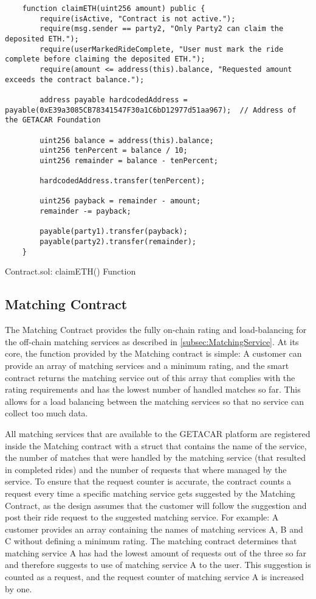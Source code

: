 \begin{Listing}
\begin{lstlisting}
    function claimETH(uint256 amount) public {
        require(isActive, "Contract is not active.");
        require(msg.sender == party2, "Only Party2 can claim the deposited ETH.");
        require(userMarkedRideComplete, "User must mark the ride complete before claiming the deposited ETH.");
        require(amount <= address(this).balance, "Requested amount exceeds the contract balance.");
        
        address payable hardcodedAddress = payable(0xE39a3085CB78341547F30a1C6bD12977d51aa967);  // Address of the GETACAR Foundation

        uint256 balance = address(this).balance;
        uint256 tenPercent = balance / 10;
        uint256 remainder = balance - tenPercent;

        hardcodedAddress.transfer(tenPercent);

        uint256 payback = remainder - amount;
        remainder -= payback;

        payable(party1).transfer(payback);
        payable(party2).transfer(remainder);
    }
\end{lstlisting}
  \caption{Contract.sol: claimETH() Function}
  \label{lst:claimETH}
\end{Listing}


\subsection{Matching Contract}

The Matching Contract provides the fully on-chain rating and load-balancing for the off-chain matching services as described in \ref{subsec:MatchingService}. At its core, the function provided by the Matching contract is simple: A customer can provide an array of matching services and a minimum rating, and the smart contract returns the matching service out of this array that complies with the rating requirements and has the lowest number of handled matches so far. This allows for a load balancing between the matching services so that no service can collect too much data.

All matching services that are available to the GETACAR platform are registered inside the Matching contract with a struct that contains the name of the service, the number of matches that were handled by the matching service (that resulted in completed rides) and the number of requests that where managed by the service. To ensure that the request counter is accurate, the contract counts a request every time a specific matching service gets suggested by the Matching Contract, as the design assumes that the customer will follow the suggestion and post their ride request to the suggested matching service. For example: A customer provides an array containing the names of matching services A, B and C without defining a minimum rating. The matching contract determines that matching service A has had the lowest amount of requests out of the three so far and therefore suggests to use of matching service A to the user. This suggestion is counted as a request, and the request counter of matching service A is increased by one.

